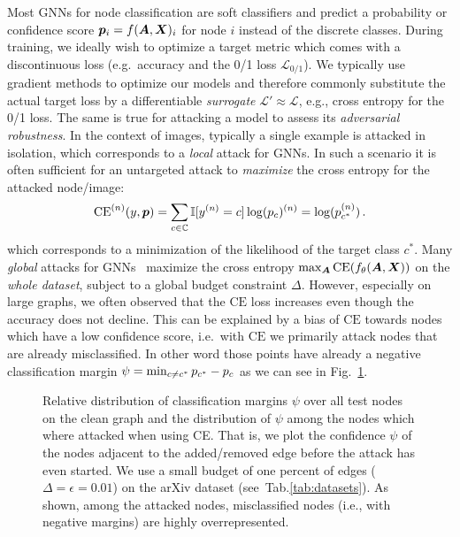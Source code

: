 \documentclass[sigconf, review]{acmart}
\newcommand{\adj}{\mA}
\newcommand{\features}{\mX}
\begin{document}
Most GNNs for node classification are soft classifiers and predict a probability or confidence score  \(\vp_i = f(\adj, \features)_i\) for node \(i\) instead of the discrete classes. During training, we ideally wish to optimize a target metric which comes with a discontinuous loss (e.g.\ accuracy and the 0/1 loss \(\mathcal{L}_{0/1}\)). We typically use gradient methods to optimize our models and therefore commonly substitute the actual target loss by a differentiable \emph{surrogate} \(\mathcal{L}' \approx \mathcal{L}\), e.g., cross entropy for the 0/1 loss. The same is true for attacking a model to assess its \emph{adversarial robustness}. In the context of images, typically a single example is attacked in isolation, which corresponds to a \emph{local} attack for GNNs. In such a scenario it is often sufficient for an untargeted attack to \textit{maximize} the cross entropy for the attacked node/image:
\begin{equation}\label{eq:crossentropy}
\text{CE}^{(n)}(y, {\bm{p}}) = \sum_{c \in {\mathbb{C}}} \mathbb{I}[y^{(n)} = c] \log({p}_{c})^{(n)} = \log({p}_{c^*}^{(n)})\,.
\end{equation}
which corresponds to a minimization of the likelihood of the target class \(c^*\). Many \emph{global} attacks for GNNs~\citep{Chen2018, Wu2019, Xu2018, Zugner2019a} maximize the cross entropy \(\max_{\adj} \text{CE}(f_{\theta}(\adj, \features))\) on the \emph{whole dataset}, subject to a global budget constraint \(\Delta\). However, especially on large graphs, we often observed that the \(\text{CE}\) loss increases even though the accuracy does not decline. This can be explained by a bias of \(\text{CE}\) towards nodes which have a low confidence score, i.e.\ with \(\text{CE}\) we primarily attack nodes that are already misclassified. In other word those points have already a negative classification margin \(\psi = \min_{c \ne c^*} {p}_{c^*} - {p}_{c}\) as we can see in Fig.~\ref{fig:negceprob}.


\begin{figure}[t]
  \centering
  \resizebox{\linewidth}{!}{} 
  \caption{Relative distribution of classification margins \(\psi\) over all test nodes on the clean graph and the distribution of \(\psi\) among the nodes which where attacked when using CE. That is, we plot the confidence \(\psi\) of the nodes adjacent to the added/removed edge before the attack has even started. We use a small budget of one percent of edges (\(\Delta=\epsilon=0.01\)) on the arXiv dataset (see~Tab.\ref{tab:datasets}). As shown, among the attacked nodes, misclassified nodes (i.e., with negative margins) are highly overrepresented.}%
  \label{fig:negceprob}
 \end{figure}
\end{document}
